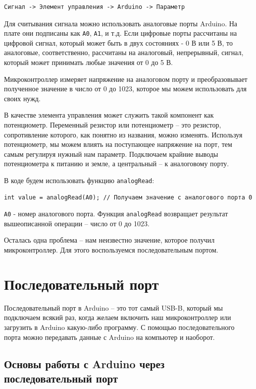 \documentclass[a4paper,twoside]{book}
\begin{document}
\begin{verbatim}
Сигнал -> Элемент управления -> Arduino -> Параметр
\end{verbatim}

Для считывания сигнала можно использовать аналоговые порты Arduino. На плате они
подписаны как \texttt{A0}, \texttt{A1}, и т.д. Если цифровые порты рассчитаны на
цифровой сигнал, который может быть в двух состояниях - 0 В или 5 В, то
аналоговые, соответственно, рассчитаны на аналоговый, непрерывный, сигнал,
который может принимать любые значения от 0 до 5 В.

Микроконтроллер измеряет напряжение на аналоговом порту и преобразовывает
полученное значение в число от 0 до 1023, которое мы можем использовать для
своих нужд.

В качестве элемента управления может служить такой компонент как потенциометр.
Переменный резистор или потенциометр -- это резистор, сопротивление которого,
как понятно из названия, можно изменять. Используя потенциометр, мы можем влиять
на поступающее напряжение на порт, тем самым регулируя нужный нам параметр.
Подключаем крайние выводы потенциометра к питанию и земле, а центральный -- к
аналоговому порту.

В коде будем использовать функцию \texttt{analogRead}:

\begin{verbatim}
int value = analogRead(A0); // Получаем значение с аналогового порта 0
\end{verbatim}

\texttt{A0} - номер аналогового порта. Функция \texttt{analogRead} возвращает
результат вышеописанной операции -- число от 0 до 1023.

Осталась одна проблема -- нам неизвестно значение, которое получил
микроконтроллер. Для этого воспользуемся последовательным портом.

\section{Последовательный порт}

Последовательный порт в Arduino -- это тот самый USB-B, который мы подключаем
всякий раз, когда желаем включить наш микроконтроллер или загрузить в Arduino
какую-либо программу. С помощью последовательного порта можно передавать данные
с Arduino на компьютер и наоборот.

\subsection{Основы работы с Arduino через последовательный порт}
\end{document}
